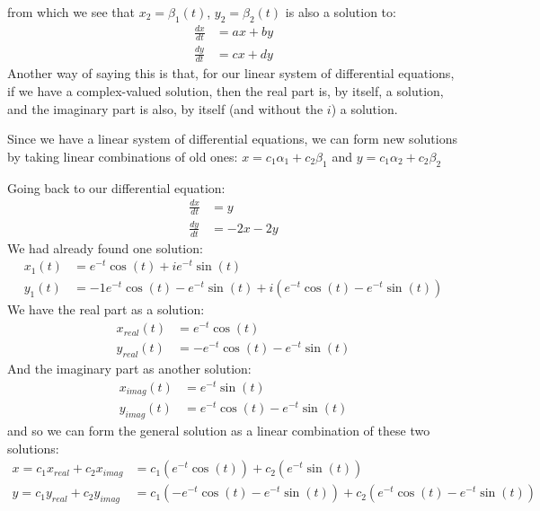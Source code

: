 from which we see that $x_2 = \beta_1(t)$, $y_2 = \beta_2(t)$ is also a solution to: 
\begin{align*}
\frac{dx}{dt} &= ax+by\\
\frac{dy}{dt} &= cx+dy
\end{align*}
Another way of saying this is that, for our linear system of differential equations, if we have a complex-valued solution, then the real part is, by itself, a solution, and the imaginary part is also, by itself (and without the $i$) a solution.  

Since we have a linear system of differential equations, we can form new solutions by taking linear combinations of old ones:
$x=c_1 \alpha_1 + c_2 \beta_1$ and $y=c_1 \alpha_2 + c_2 \beta_2$

Going back to our differential equation: 
\begin{align*}
\frac{dx}{dt}&=y \\ \frac{dy}{dt}&= -2x-2y
\end{align*}
We had already found one solution: \begin{align*}
x_1(t) &= e^{-t}\cos(t) + i e^{-t}\sin(t)\\
y_1(t) &= -1e^{-t}\cos(t) - e^{-t}\sin(t) + i(e^{-t}\cos(t) - e^{-t}\sin(t))
\end{align*}
We have the real part as a solution:
\begin{align*}
x_{real}(t) &= e^{-t}\cos(t)\\
y_{real}(t) &= -e^{-t}\cos(t) - e^{-t}\sin(t)
\end{align*}
And the imaginary part as another solution:
\begin{align*}
x_{imag}(t) &= e^{-t}\sin(t)\\
y_{imag}(t) &= e^{-t}\cos(t) - e^{-t}\sin(t)
\end{align*}
and so we can form the general solution as a linear combination of these two solutions:
\begin{align*} 
x = c_1 x_{real} + c_2 x_{imag} &=c_1 (e^{-t}\cos(t)) + c_2 (e^{-t}\sin(t))\\
y = c_1 y_{real} + c_2 y_{imag} &= c_1 (-e^{-t}\cos(t) - e^{-t}\sin(t)) + c_2 (e^{-t}\cos(t) - e^{-t}\sin(t))
\end{align*}

